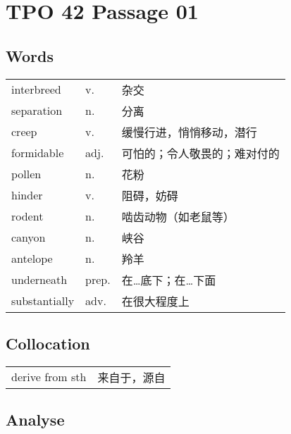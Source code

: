 \section{TPO 42 Passage 01}

\subsection{Words}

\begin{tabular}{lll}
    interbreed    & v.    & 杂交             \\
    separation    & n.    & 分离             \\
    creep         & v.    & 缓慢行进，悄悄移动，潜行   \\
    formidable    & adj.  & 可怕的；令人敬畏的；难对付的 \\
    pollen        & n.    & 花粉             \\
    hinder        & v.    & 阻碍，妨碍          \\
    rodent        & n.    & 啮齿动物（如老鼠等）     \\
    canyon        & n.    & 峡谷             \\
    antelope      & n.    & 羚羊             \\
    underneath    & prep. & 在…底下；在…下面      \\
    substantially & adv.  & 在很大程度上         \\
\end{tabular}

\subsection{Collocation}

\begin{tabular}{ll}
    derive from sth & 来自于，源自 \\
\end{tabular}

\subsection{Analyse}

